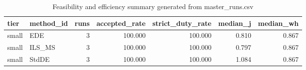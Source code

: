 \begin{table}[!t]
\centering
\caption{Feasibility and efficiency summary generated from master_runs.csv}
\label{tab:feasibility_summary_generated}
\begin{tabular}{llrrrrr}
\toprule
tier & method_id & runs & accepted_rate & strict_duty_rate & median_j & median_wh \\
\midrule
small & EDE & 3 & 100.000 & 100.000 & 0.810 & 0.867 \\
small & ILS_MS & 3 & 100.000 & 100.000 & 0.797 & 0.867 \\
small & StdDE & 3 & 100.000 & 100.000 & 1.084 & 0.867 \\
\bottomrule
\end{tabular}

\end{table}